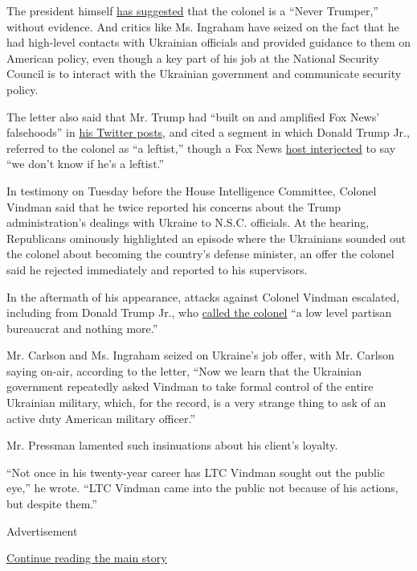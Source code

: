 The president himself
\href{https://www.whitehouse.gov/briefings-statements/remarks-president-trump-marine-one-departure-74/}{has
suggested} that the colonel is a ``Never Trumper,'' without evidence.
And critics like Ms. Ingraham have seized on the fact that he had
high-level contacts with Ukrainian officials and provided guidance to
them on American policy, even though a key part of his job at the
National Security Council is to interact with the Ukrainian government
and communicate security policy.

The letter also said that Mr. Trump had ``built on and amplified Fox
News' falsehoods'' in
\href{https://twitter.com/Scavino45/status/1196860213233684480}{his
Twitter posts}, and cited a segment in which Donald Trump Jr., referred
to the colonel as ``a leftist,'' though a Fox News
\href{https://thehill.com/homenews/administration/468144-trump-jr-attacks-vindman-total-absolution-if-you-are-a-leftist}{host
interjected} to say ``we don't know if he's a leftist.''

In testimony on Tuesday before the House Intelligence Committee, Colonel
Vindman said that he twice reported his concerns about the Trump
administration's dealings with Ukraine to N.S.C. officials. At the
hearing, Republicans ominously highlighted an episode where the
Ukrainians sounded out the colonel about becoming the country's defense
minister, an offer the colonel said he rejected immediately and reported
to his supervisors.

In the aftermath of his appearance, attacks against Colonel Vindman
escalated, including from Donald Trump Jr., who
\href{https://twitter.com/DonaldJTrumpJr/status/1196845403129421824}{called
the colonel} ``a low level partisan bureaucrat and nothing more.''

Mr. Carlson and Ms. Ingraham seized on Ukraine's job offer, with Mr.
Carlson saying on-air, according to the letter, ``Now we learn that the
Ukrainian government repeatedly asked Vindman to take formal control of
the entire Ukrainian military, which, for the record, is a very strange
thing to ask of an active duty American military officer.''

Mr. Pressman lamented such insinuations about his client's loyalty.

``Not once in his twenty-year career has LTC Vindman sought out the
public eye,'' he wrote. ``LTC Vindman came into the public not because
of his actions, but despite them.''

Advertisement

\protect\hyperlink{after-bottom}{Continue reading the main story}

